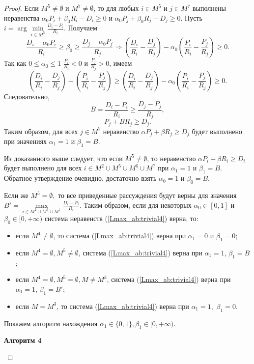 \begin{proof}
Если $M^5 \neq \emptyset$ и $M^7 \neq \emptyset$, то для любых $i \in M^5$ и $j \in M^7$ выполнены неравенства $\alpha_0 P_i + \beta_0 R_i  - D_i \geq 0$ и $\alpha_0 P_j + \beta_0 R_j  - D_j \geq 0$.
Пусть $i = \arg \min\limits_{i \in M^5} \frac{D_i - P_i}{R_i}$. Получаем
$$\frac{D_i - \alpha_0 P_i}{R_i} \geq \beta_0 \geq \frac{D_j - \alpha_0 P_j}{R_j} \Rightarrow (\frac{D_i}{R_i} - \frac{D_j}{R_j}) - \alpha_0 (\frac{P_i}{R_i} - \frac{P_j}{R_j}) \geq 0.$$
Так как $0 \leq \alpha_0 \leq 1$ $\frac{P_i}{R_i} < 0$ и $\frac{P_j}{R_j} > 0$, имеем
$$(\frac{D_i}{R_i} - \frac{D_j}{R_j}) - (\frac{P_i}{R_i} - \frac{P_j}{R_j}) \geq (\frac{D_i}{R_i} - \frac{D_j}{R_j}) - \alpha_0 (\frac{P_i}{R_i} - \frac{P_j}{R_j}) \geq 0.$$
Следовательно,
$$B = \frac{D_i - P_i}{R_i} \geq \frac{D_j - P_j}{R_j},$$
$$P_j + B R_j \geq D_j.$$
Таким образом, для всех $j \in M^7$ неравенство $\alpha P_j + \beta R_j \geq D_j$ будет выполнено при значениях $\alpha_1 = 1$ и $\beta_1 = B$.

Из доказанного выше следует, что если $M^5 \neq \emptyset$, то неравенство $\alpha P_i + \beta R_i \geq D_i$ будет выполнено для всех $i \in M^2 \cup M^5 \cup M^6 \cup M^7$ при $\alpha_1 = 1$ и $\beta_1 = B$. Обратное утверждение очевидно, достаточно взять $\alpha_0 = 1$ и $\beta_0 = B$.

Если же $M^5 = \emptyset,$ то все приведенные рассуждения будут верны для значения $B' = \max\limits_{i \in M^2 \cup M^6 \cup M^7} \frac{D_i - P_i}{R_i}$. Таким образом, если для некоторых $\alpha_0 \in [0,1]$ и $\beta_0 \in [0, +\infty)$ система неравенств (\ref{Lmax_ab:trivial4}) верна, то:
\begin{itemize}
\item если $M^4 \neq \emptyset$, то система (\ref{Lmax_ab:trivial4}) верна при $\alpha_1 = 0$ и $\beta_1 = 0$;
\item если $M^4 = \emptyset, M^5 \neq \emptyset$, система (\ref{Lmax_ab:trivial4}) верна при $\alpha_1 = 1$, $\beta_1 = B$;
\item если $M^4 = \emptyset, M^5 = \emptyset, M \neq M^3$, система (\ref{Lmax_ab:trivial4}) верна при $\alpha_1 = 1$, $\beta_1 = B'$;
\item если $M = M^3$, то система (\ref{Lmax_ab:trivial4}) верна при $\alpha_1 = 1,$ $\beta_1 = 0$.
\end{itemize}

Покажем алгоритм нахождения $\alpha_1 \in \{0,1\}, \beta_1 \in [0, +\infty)$.\\
\begin{algorithm}[H]
\NoCaptionOfAlgo
\caption{\textbf{Алгоритм 4}\label{Lmax_ab:alg:4}}
\small
\SetAlgoLined
{}


\end{algorithm}
\end{proof}
